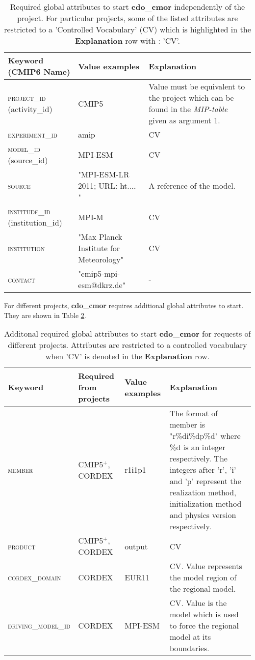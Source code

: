 \begin{table}[H]
\caption{Required global attributes to start \textbf{cdo\_cmor} independently of the project. For particular projects, some of the listed attributes are restricted to a 'Controlled Vocabulary' (CV) which is highlighted in the \textbf{Explanation} row with : 'CV'.}
\label{table:RequiredGeneral}
\begin{tabular}[H]{|l|l| p{5cm} | }
\hline 
\textbf{Keyword (CMIP6 Name)} & \textbf{Value examples} & \textbf{Explanation}  \\ 
\hline 
\textsc{project\_id} (activity\_id) & CMIP5 & Value must be equivalent to the project which can be found in the \textit{MIP-table} given as argument 1. \\ 
\hline 
\textsc{experiment\_id} & amip & CV \\ 
\hline 
\textsc{model\_id} (source\_id) & MPI-ESM & CV \\ 
\hline 
\textsc{source} & "MPI-ESM-LR 2011; URL: ht.... " & A reference of the model. \\ 
\hline 
\textsc{institude\_id} (institution\_id) & MPI-M & CV \\ 
\hline 
\textsc{institution} & "Max Planck Institute for Meteorology" & CV \\ 
\hline 
\textsc{contact} & "cmip5-mpi-esm@dkrz.de" & - \\ 
\hline 
\end{tabular} 
\end{table}

For different projects, \textbf{cdo\_cmor} requires additional global attributes to start. They are shown in Table \ref{table:RequiredAdditional}.

\begin{table}[H]
\caption{Additonal required global attributes to start \textbf{cdo\_cmor} for requests of different projects. Attributes are restricted to a controlled vocabulary when 'CV' is denoted in the \textbf{Explanation} row.}
\label{table:RequiredAdditional}
\begin{tabular}[H]{|l| p{2cm} |l| p{7cm} | }
\hline 
\textbf{Keyword} & \textbf{Required from projects} & \textbf{Value examples} & \textbf{Explanation}  \\ 
\hline
\textsc{member} & CMIP5$^{+}$, CORDEX & r1i1p1 & The format of member is "r\%di\%dp\%d" where \%d is an integer respectively. The integers after 'r', 'i' and 'p' represent the realization method,  initialization method and physics version respectively. \\
\hline
\textsc{product} & CMIP5$^{+}$, CORDEX & output & CV \\
\hline
\textsc{cordex\_domain} & CORDEX & EUR11 & CV. Value represents the model region of the regional model.\\
\hline
\textsc{driving\_model\_id} & CORDEX & MPI-ESM & CV. Value is the model which is used to force the regional model at its boundaries. \\
\hline
\end{tabular} 
\end{table}

